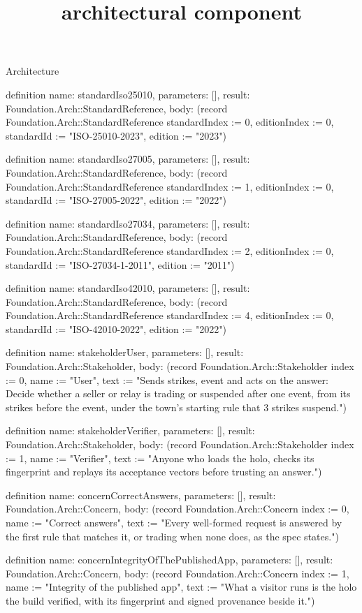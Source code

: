 \begin{lexlean}{Architecture}
\title{architectural component}
\begin{semanticmodule}
definition{
  name: standardIso25010,
  parameters: [],
  result: Foundation.Arch::StandardReference,
  body: (record Foundation.Arch::StandardReference {standardIndex := 0, editionIndex := 0, standardId := "ISO-25010-2023", edition := "2023"})
}

definition{
  name: standardIso27005,
  parameters: [],
  result: Foundation.Arch::StandardReference,
  body: (record Foundation.Arch::StandardReference {standardIndex := 1, editionIndex := 0, standardId := "ISO-27005-2022", edition := "2022"})
}

definition{
  name: standardIso27034,
  parameters: [],
  result: Foundation.Arch::StandardReference,
  body: (record Foundation.Arch::StandardReference {standardIndex := 2, editionIndex := 0, standardId := "ISO-27034-1-2011", edition := "2011"})
}

definition{
  name: standardIso42010,
  parameters: [],
  result: Foundation.Arch::StandardReference,
  body: (record Foundation.Arch::StandardReference {standardIndex := 4, editionIndex := 0, standardId := "ISO-42010-2022", edition := "2022"})
}

definition{
  name: stakeholderUser,
  parameters: [],
  result: Foundation.Arch::Stakeholder,
  body: (record Foundation.Arch::Stakeholder {index := 0, name := "User", text := "Sends strikes, event and acts on the answer: Decide whether a seller or relay is trading or suspended after one event, from its strikes before the event, under the town's starting rule that 3 strikes suspend."})
}

definition{
  name: stakeholderVerifier,
  parameters: [],
  result: Foundation.Arch::Stakeholder,
  body: (record Foundation.Arch::Stakeholder {index := 1, name := "Verifier", text := "Anyone who loads the holo, checks its fingerprint and replays its acceptance vectors before trusting an answer."})
}

definition{
  name: concernCorrectAnswers,
  parameters: [],
  result: Foundation.Arch::Concern,
  body: (record Foundation.Arch::Concern {index := 0, name := "Correct answers", text := "Every well-formed request is answered by the first rule that matches it, or trading when none does, as the spec states."})
}

definition{
  name: concernIntegrityOfThePublishedApp,
  parameters: [],
  result: Foundation.Arch::Concern,
  body: (record Foundation.Arch::Concern {index := 1, name := "Integrity of the published app", text := "What a visitor runs is the holo the build verified, with its fingerprint and signed provenance beside it."})
}


\end{semanticmodule}
\end{lexlean}
